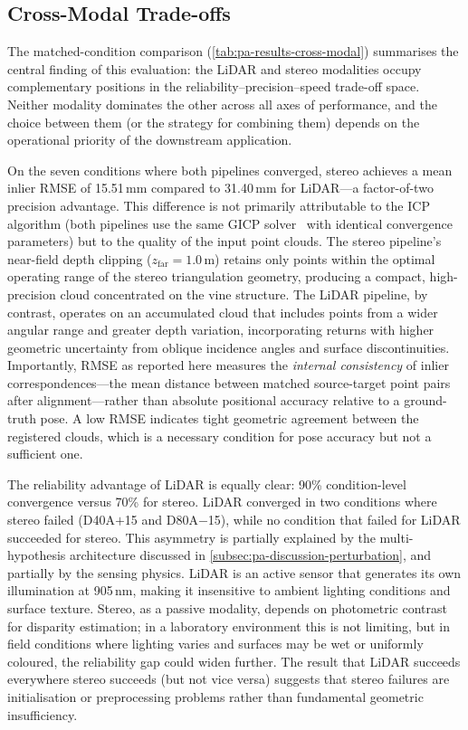 \subsection{Cross-Modal Trade-offs}
\label{subsec:pa-discussion-cross-modal}

The matched-condition comparison (\cref{tab:pa-results-cross-modal}) summarises the central finding of this evaluation: the LiDAR and stereo modalities occupy complementary positions in the reliability--precision--speed trade-off space. Neither modality dominates the other across all axes of performance, and the choice between them (or the strategy for combining them) depends on the operational priority of the downstream application.

On the seven conditions where both pipelines converged, stereo achieves a mean inlier RMSE of 15.51\,mm compared to 31.40\,mm for LiDAR---a factor-of-two precision advantage. This difference is not primarily attributable to the ICP algorithm (both pipelines use the same GICP solver~\cite{segalGeneralizedICP2009} with identical convergence parameters) but to the quality of the input point clouds. The stereo pipeline's near-field depth clipping ($z_\text{far} = 1.0$\,m) retains only points within the optimal operating range of the stereo triangulation geometry, producing a compact, high-precision cloud concentrated on the vine structure. The LiDAR pipeline, by contrast, operates on an accumulated cloud that includes points from a wider angular range and greater depth variation, incorporating returns with higher geometric uncertainty from oblique incidence angles and surface discontinuities. Importantly, RMSE as reported here measures the \emph{internal consistency} of inlier correspondences---the mean distance between matched source-target point pairs after alignment---rather than absolute positional accuracy relative to a ground-truth pose. A low RMSE indicates tight geometric agreement between the registered clouds, which is a necessary condition for pose accuracy but not a sufficient one.

The reliability advantage of LiDAR is equally clear: 90\% condition-level convergence versus 70\% for stereo. LiDAR converged in two conditions where stereo failed (D40A$+$15 and D80A$-$15), while no condition that failed for LiDAR succeeded for stereo. This asymmetry is partially explained by the multi-hypothesis architecture discussed in \cref{subsec:pa-discussion-perturbation}, and partially by the sensing physics. LiDAR is an active sensor that generates its own illumination at 905\,nm, making it insensitive to ambient lighting conditions and surface texture. Stereo, as a passive modality, depends on photometric contrast for disparity estimation; in a laboratory environment this is not limiting, but in field conditions where lighting varies and surfaces may be wet or uniformly coloured, the reliability gap could widen further. The result that LiDAR succeeds everywhere stereo succeeds (but not vice versa) suggests that stereo failures are initialisation or preprocessing problems rather than fundamental geometric insufficiency.


